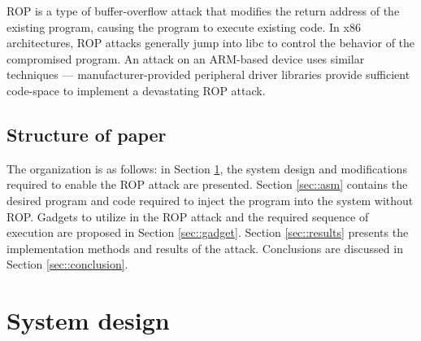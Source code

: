 	ROP is a type of buffer-overflow attack that modifies the return address of the existing program, causing the program to execute existing code. In x86 architectures, ROP attacks generally jump into libc to control the behavior of the compromised program. An attack on an ARM-based device uses similar techniques --- manufacturer-provided peripheral driver libraries provide sufficient code-space to implement a devastating ROP attack.  



\subsection{Structure of paper}
	The organization is as follows: in Section \ref{sec::design}, the system design and modifications required to enable the ROP attack are presented. Section \ref{sec::asm} contains the desired program and code required to inject the program into the system without ROP. Gadgets to utilize in the ROP attack and the required sequence of execution are proposed in Section \ref{sec::gadget}. Section \ref{sec::results} presents the implementation methods and results of the attack. Conclusions are discussed in Section \ref{sec::conclusion}. 




\section{System design} \label{sec::design} %


